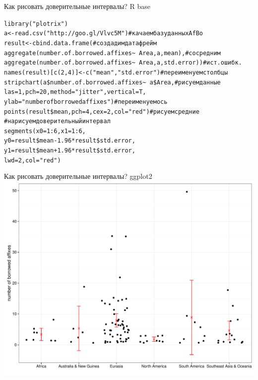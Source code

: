 \begin{frame}{Как рисовать доверительные интервалы? R base}
\scriptsize
\begin{alltt}
library("plotrix")\\
a <- read.csv("http://goo.gl/Vlvc5M") \hfill \# качаем базу данных AfBo\\
result <- cbind.data.frame(\hfill \# создадим дата фрейм\\
aggregate(number.of.borrowed.affixes \textasciitilde\ Area, a, mean), \hfill \# со средним\\
                           aggregate(number.of.borrowed.affixes \textasciitilde\ Area, a, std.error)) \hfill \# и ст. ошибк.\\
names(result)[c(2, 4)] <- c("mean"{}, "std.error")\hfill \# переименуем столбцы\medskip\\
stripchart(a\$number.of.borrowed.affixes \textasciitilde\ a\$Area, \hfill \# рисуем данные\\
           las = 1, pch = 20, method = "jitter"{}, vertical = T,\\
           ylab = "number of borrowed affixes")\hfill \# переименуем ось \medskip\\
points(result\$mean, pch = 4, cex = 2, col = "red") \hfill \# рисуем средние\\
\# нарисуем доверительный интервал\\
\alert{segments(x0 = 1:6, x1 = 1:6,\\
         y0 = result\$mean-1.96*result\$std.error,\\
         y1 = result\$mean+1.96*result\$std.error,\\
         lwd = 2, col = "red")}
\end{alltt}
\normalsize
\end{frame}
\begin{frame}{Как рисовать доверительные интервалы? ggplot2}
\includegraphics[width=0.97\linewidth]{ggplot}
\end{frame}
